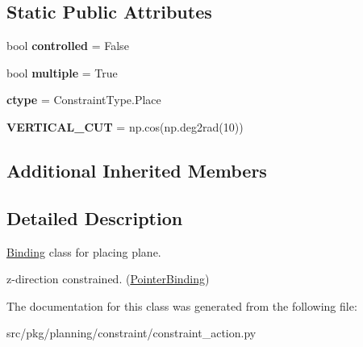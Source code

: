 \subsection*{Static Public Attributes}
\begin{DoxyCompactItemize}
\item 
\mbox{\label{classrnb-planning_1_1src_1_1pkg_1_1planning_1_1constraint_1_1constraint__action_1_1_place_plane_a7a59c88f6ebe64f2cd6e3bb89699a264}} 
bool {\bfseries controlled} = False
\item 
\mbox{\label{classrnb-planning_1_1src_1_1pkg_1_1planning_1_1constraint_1_1constraint__action_1_1_place_plane_afb40258ec64ba73c6771a6dac85e2a1a}} 
bool {\bfseries multiple} = True
\item 
\mbox{\label{classrnb-planning_1_1src_1_1pkg_1_1planning_1_1constraint_1_1constraint__action_1_1_place_plane_a9e9df214b4e673f4d3824904b00da77a}} 
{\bfseries ctype} = Constraint\+Type.\+Place
\item 
\mbox{\label{classrnb-planning_1_1src_1_1pkg_1_1planning_1_1constraint_1_1constraint__action_1_1_place_plane_a04625192e71c9b770f433a4866cebe65}} 
{\bfseries V\+E\+R\+T\+I\+C\+A\+L\+\_\+\+C\+UT} = np.\+cos(np.\+deg2rad(10))
\end{DoxyCompactItemize}
\subsection*{Additional Inherited Members}


\subsection{Detailed Description}
\hyperlink{classrnb-planning_1_1src_1_1pkg_1_1planning_1_1constraint_1_1constraint__action_1_1_binding}{Binding} class for placing plane. 

z-\/direction constrained. (\hyperlink{classrnb-planning_1_1src_1_1pkg_1_1planning_1_1constraint_1_1constraint__action_1_1_pointer_binding}{Pointer\+Binding}) 

The documentation for this class was generated from the following file\+:\begin{DoxyCompactItemize}
\item 
src/pkg/planning/constraint/constraint\+\_\+action.\+py\end{DoxyCompactItemize}
